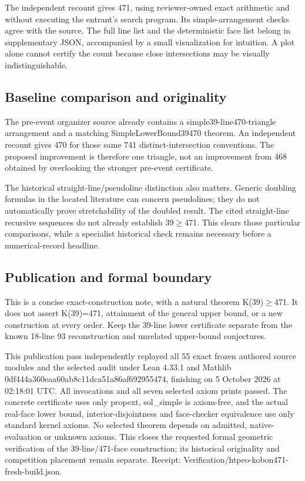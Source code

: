 \documentclass[11pt,a4paper]{article}
\begin{document}
The independent recount gives 471, using reviewer-owned exact arithmetic and without executing the entrant's search program. Its simple-arrangement checks agree with the source. The full line list and the deterministic face list belong in supplementary JSON, accompanied by a small visualization for intuition. A plot alone cannot certify the count because close intersections may be visually indistinguishable.

\subsection{Baseline comparison and originality}
The pre-event organizer source already contains a simple39-line470-triangle arrangement and a matching SimpleLowerBound39470 theorem. An independent recount gives 470 for those same 741 distinct-intersection conventions. The proposed improvement is therefore one triangle, not an improvement from 468 obtained by overlooking the stronger pre-event certificate.

The historical straight-line/pseudoline distinction also matters. Generic doubling formulas in the located literature can concern pseudolines; they do not automatically prove stretchability of the doubled result. The cited straight-line recursive sequences do not already establish 39\ensuremath{\geq}471. This clears those particular comparisons, while a specialist historical check remains necessary before a numerical-record headline.

\subsection{Publication and formal boundary}
This is a concise exact-construction note, with a natural theorem K(39)\ensuremath{\geq}471. It does not assert K(39)=471, attainment of the general upper bound, or a new construction at every order. Keep the 39-line lower certificate separate from the known 18-line 93 reconstruction and unrelated upper-bound conjectures.

This publication pass independently replayed all 55 exact frozen authored source modules and the selected audit under Lean 4.33.1 and Mathlib 0df444a360eaa60ab8c11dca51a86af692955474, finishing on 5 October 2026 at 02:18:01 UTC. All invocations and all seven selected axiom prints passed. The concrete certificate uses only propext, sol\_simple is axiom-free, and the actual real-face lower bound, interior-disjointness and face-checker equivalence use only standard kernel axioms. No selected theorem depends on admitted, native-evaluation or unknown axioms. This closes the requested formal geometric verification of the 39-line/471-face construction; its historical originality and competition placement remain separate. Receipt: Verification/htpeo-kobon471-fresh-build.json.
\end{document}
